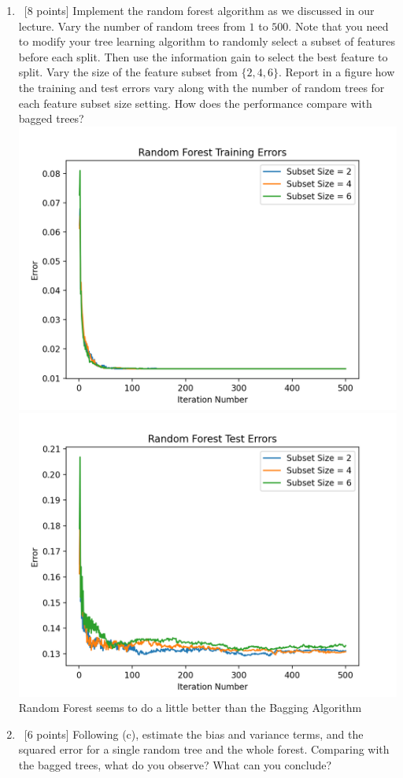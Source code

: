 \documentclass[12pt, fullpage,letterpaper]{article}
\begin{document}
\begin{enumerate}
\begin{enumerate}
	 
	\item~[8 points] Implement the random forest algorithm as we discussed in our lecture. Vary the number of random trees from $1$ to $500$. Note that you need to modify your tree learning algorithm to randomly select a subset of features before each split. Then use the information gain to select the best feature to split.  Vary the size of the feature subset from $\{2, 4, 6\}$.  Report in a figure how the training and test errors vary along with the number of random trees for each feature subset size setting. How does the performance compare with bagged trees? 
	\newline
	\includegraphics[scale=0.8]{RFTrain.png}
	\newline
	\includegraphics[scale=0.8]{RFTest.png}
	\newline
	Random Forest seems to do a little better than the Bagging Algorithm
	\item~[6 points] Following (c), estimate the bias and variance terms, and the squared error for a single random tree and the whole forest.  Comparing with the bagged trees, what do you observe? What can you conclude? 
\end{enumerate}


\end{enumerate}
\end{document}
